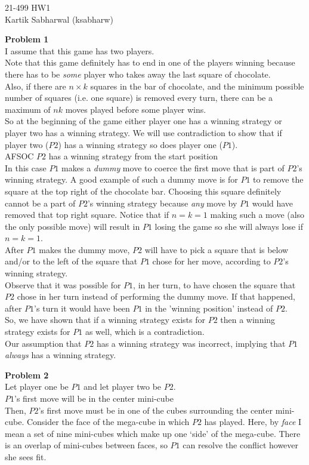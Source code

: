 \documentclass{article}
\newcommand{\B}[1]{\textbf{#1}}
\begin{document}
\begin{center}
21-499 HW1 \\
Kartik Sabharwal (ksabharw)
\end{center}
\B{Problem 1} \\
I assume that this game has two players. \\
Note that this game definitely has to end in one of the players winning because there has to be \textit{some} player who takes away the last square of chocolate. \\
Also, if there are $n\times k$ squares in the bar of chocolate, and the minimum possible number of squares (i.e. one square) is removed every turn, there can be a maximum of $nk$ moves played before some player wins. \\
So at the beginning of the game either player one has a winning strategy or player two has a winning strategy. We will use contradiction to show that if player two ($P2$) has a winning strategy so does player one ($P1$). \\
AFSOC $P2$ has a winning strategy from the start position \\
In this case $P1$ makes a \textit{dummy} move to coerce the first move that is part of $P2$'s winning strategy. A good example of such a dummy move is for $P1$ to remove the square at the top right of the chocolate bar. Choosing this square definitely cannot be a part of $P2$'s winning strategy because \textit{any} move by $P1$ would have removed that top right square. Notice that if $n=k=1$ making such a move (also the only possible move) will result in $P1$ losing the game so she will always lose if $n=k=1$. \\
After $P1$ makes the dummy move, $P2$ will have to pick a square that is below and/or to the left of the square that $P1$ chose for her move, according to $P2$'s winning strategy. \\
Observe that it was possible for $P1$, in her turn, to have chosen the square that $P2$ chose in her turn instead of performing the dummy move. If that happened, after $P1$'s turn it would have been $P1$ in the 'winning position' instead of $P2$. \\
So, we have shown that if a winning strategy exists for $P2$ then a winning strategy exists for $P1$ as well, which is a contradiction. \\
Our assumption that $P2$ has a winning strategy was incorrect, implying that $P1$ \textit{always} has a winning strategy.

\bigskip
\B{Problem 2} \\
Let player one be $P1$ and let player two be $P2$. \\
$P1$'s first move will be in the center mini-cube \\
Then, $P2$'s first move must be in one of the cubes surrounding the center mini-cube. Consider the face of the mega-cube in which $P2$ has played. Here, by \textit{face} I mean a set of nine mini-cubes which make up one `side' of the mega-cube. There is an overlap of mini-cubes between faces, so $P1$ can resolve the conflict however she sees fit.
\end{document}
